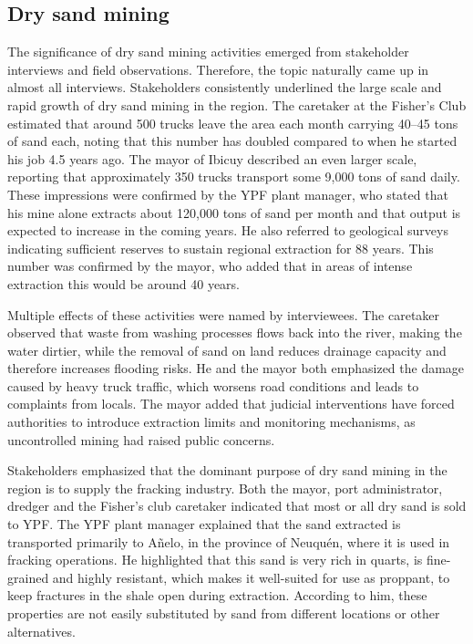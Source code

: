\subsection{Dry sand mining}
The significance of dry sand mining activities emerged from stakeholder interviews and field observations. Therefore, the topic naturally came up in almost all interviews. Stakeholders consistently underlined the large scale and rapid growth of dry sand mining in the region. The caretaker at the Fisher’s Club estimated that around 500 trucks leave the area each month carrying 40–45 tons of sand each, noting that this number has doubled compared to when he started his job 4.5 years ago. The mayor of Ibicuy described an even larger scale, reporting that approximately 350 trucks transport some 9,000 tons of sand daily. These impressions were confirmed by the YPF plant manager, who stated that his mine alone extracts about 120,000 tons of sand per month and that output is expected to increase in the coming years. He also referred to geological surveys indicating sufficient reserves to sustain regional extraction for 88 years. This number was confirmed by the mayor, who added that in areas of intense extraction this would be around 40 years.

Multiple effects of these activities were named by interviewees. The caretaker observed that waste from washing processes flows back into the river, making the water dirtier, while the removal of sand on land reduces drainage capacity and therefore increases flooding risks. He and the mayor both emphasized the damage caused by heavy truck traffic, which worsens road conditions and leads to complaints from locals. The mayor added that judicial interventions have forced authorities to introduce extraction limits and monitoring mechanisms, as uncontrolled mining had raised public concerns.

Stakeholders emphasized that the dominant purpose of dry sand mining in the region is to supply the fracking industry. Both the mayor, port administrator, dredger and the Fisher's club caretaker indicated that most or all dry sand is sold to YPF. The YPF plant manager explained that the sand extracted is transported primarily to Añelo, in the province of Neuquén, where it is used in fracking operations. He highlighted that this sand is very rich in quarts, is fine-grained and highly resistant, which makes it well-suited for use as proppant, to keep fractures in the shale open during extraction. According to him, these properties are not easily substituted by sand from different locations or other alternatives.

